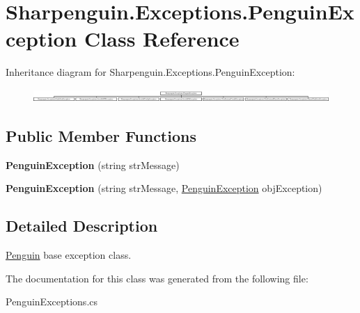 \hypertarget{classSharpenguin_1_1Exceptions_1_1PenguinException}{\section{\-Sharpenguin.\-Exceptions.\-Penguin\-Exception \-Class \-Reference}
\label{classSharpenguin_1_1Exceptions_1_1PenguinException}
}
\-Inheritance diagram for \-Sharpenguin.\-Exceptions.\-Penguin\-Exception\-:\begin{figure}[H]
\begin{center}
\leavevmode
\includegraphics[height=0.501567cm]{classSharpenguin_1_1Exceptions_1_1PenguinException}
\end{center}
\end{figure}
\subsection*{\-Public \-Member \-Functions}
\begin{DoxyCompactItemize}
\item 
\hypertarget{classSharpenguin_1_1Exceptions_1_1PenguinException_a871080c38a4495954b949a98e8f1607a}{{\bfseries \-Penguin\-Exception} (string str\-Message)}\label{classSharpenguin_1_1Exceptions_1_1PenguinException_a871080c38a4495954b949a98e8f1607a}

\item 
\hypertarget{classSharpenguin_1_1Exceptions_1_1PenguinException_ae22f86a910bc8ee138a0d3f7b9f724cc}{{\bfseries \-Penguin\-Exception} (string str\-Message, \hyperlink{classSharpenguin_1_1Exceptions_1_1PenguinException}{\-Penguin\-Exception} obj\-Exception)}\label{classSharpenguin_1_1Exceptions_1_1PenguinException_ae22f86a910bc8ee138a0d3f7b9f724cc}

\end{DoxyCompactItemize}


\subsection{\-Detailed \-Description}
\hyperlink{classSharpenguin_1_1Penguin}{\-Penguin} base exception class. 

\-The documentation for this class was generated from the following file\-:\begin{DoxyCompactItemize}
\item 
\-Penguin\-Exceptions.\-cs\end{DoxyCompactItemize}
